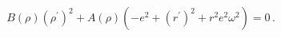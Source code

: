 \begin{equation}
B(\rho) \left(\rho^\prime\right)^2 + A(\rho)\left(-e^2 + (r^\prime)^2 + r^2 e^2 \omega^2\right)=0\,.
\end{equation}

